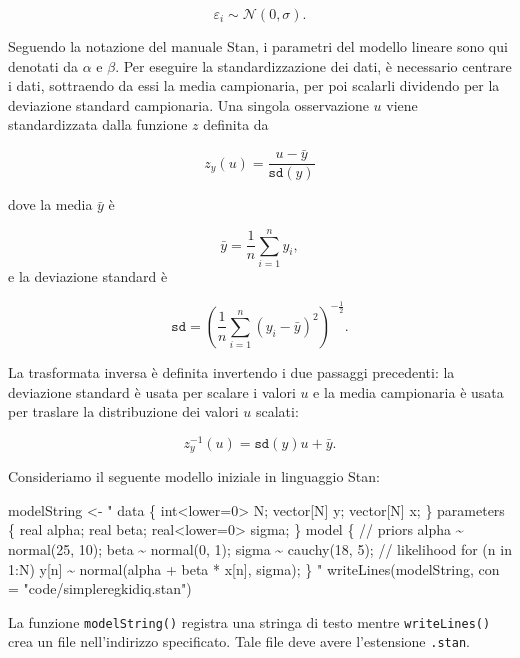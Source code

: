 \documentclass[
  11pt,
]{krantz}
\makeatletter
\newenvironment{Shaded}{\begin{snugshade}}{\end{snugshade}}
\newcommand{\AttributeTok}[1]{\textcolor[rgb]{0.61,0.61,0.61}{#1}}
\newcommand{\FunctionTok}[1]{\textcolor[rgb]{0,0,0}{#1}}
\newcommand{\NormalTok}[1]{#1}
\newcommand{\OtherTok}[1]{\textcolor[rgb]{0.37,0.37,0.37}{#1}}
\newcommand{\StringTok}[1]{\textcolor[rgb]{0.5,0.5,0.5}{#1}}
\newenvironment{kframe}{%
\medskip{}
\setlength{\fboxsep}{.8em}
 \def\at@end@of@kframe{}%
 \ifinner\ifhmode%
  \def\at@end@of@kframe{\end{minipage}}%
  \begin{minipage}{\columnwidth}%
 \fi\fi%
 \def\FrameCommand##1{\hskip\@totalleftmargin \hskip-\fboxsep
 \colorbox{shadecolor}{##1}\hskip-\fboxsep
     \hskip-\linewidth \hskip-\@totalleftmargin \hskip\columnwidth}%
 \MakeFramed {\advance\hsize-\width
   \@totalleftmargin\z@ \linewidth\hsize
   \@setminipage}}%
 {\par\unskip\endMakeFramed%
 \at@end@of@kframe}
\renewenvironment{Shaded}{\begin{kframe}}{\end{kframe}}
\theoremstyle{definition}
\theoremstyle{definition}
\theoremstyle{definition}
\theoremstyle{definition}
\theoremstyle{remark}
\makeatother
\begin{document}
\[
\varepsilon_i \sim \mathcal{N}(0, \sigma).
\]

Seguendo la notazione del manuale Stan, i parametri del modello lineare sono qui denotati da \(\alpha\) e \(\beta\). Per eseguire la standardizzazione dei dati, è necessario centrare i dati, sottraendo da essi la media campionaria, per poi scalarli dividendo per la deviazione standard campionaria. Una singola osservazione \(u\) viene standardizzata dalla funzione \(z\) definita da

\[
z_y(u) = \frac{u - \bar{y}}{\texttt{sd}(y)}
\]

dove la media \(\bar{y}\) è

\[
\bar{y} = \frac{1}{n} \sum_{i=1}^n y_i,
\] e la deviazione standard è

\[
\texttt{sd} = \left(\frac{1}{n}\sum_{i=1}^n(y_i - \bar{y})^2\right)^{-\frac{1}{2}}.
\]

La trasformata inversa è definita invertendo i due passaggi precedenti: la deviazione standard è usata per scalare i valori \(u\) e la media campionaria è usata per traslare la distribuzione dei valori \(u\) scalati:

\[
z_y^{-1}(u) = \texttt{sd}(y)u + \bar{y}.
\]

Consideriamo il seguente modello iniziale in linguaggio Stan:

\begin{Shaded}
\begin{Highlighting}[]
\NormalTok{modelString }\OtherTok{\textless{}{-}} \StringTok{"}
\StringTok{data \{}
\StringTok{  int\textless{}lower=0\textgreater{} N;}
\StringTok{  vector[N] y;}
\StringTok{  vector[N] x;}
\StringTok{\}}
\StringTok{parameters \{}
\StringTok{  real alpha;}
\StringTok{  real beta;}
\StringTok{  real\textless{}lower=0\textgreater{} sigma;}
\StringTok{\}}
\StringTok{model \{}
\StringTok{  // priors}
\StringTok{  alpha \textasciitilde{} normal(25, 10);}
\StringTok{  beta \textasciitilde{} normal(0, 1);}
\StringTok{  sigma \textasciitilde{} cauchy(18, 5);}
\StringTok{  // likelihood}
\StringTok{  for (n in 1:N)}
\StringTok{    y[n] \textasciitilde{} normal(alpha + beta * x[n], sigma);}
\StringTok{\}}
\StringTok{"}
\FunctionTok{writeLines}\NormalTok{(modelString, }\AttributeTok{con =} \StringTok{"code/simpleregkidiq.stan"}\NormalTok{)}
\end{Highlighting}
\end{Shaded}

La funzione \texttt{modelString()} registra una stringa di testo mentre \texttt{writeLines()} crea un file nell'indirizzo specificato. Tale file deve avere l'estensione \texttt{.stan}.
\end{document}
